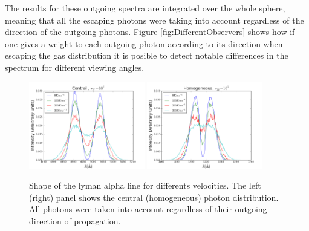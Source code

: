 \documentclass[usenatbib]{mn2e}
\begin{document}
The results for these outgoing spectra are integrated over the whole
sphere, meaning that all the escaping photons were taking into account
regardless of the direction of the outgoing photons. Figure
\ref{fig:DifferentObservers} shows how if one gives a weight to each outgoing
photon according to its direction when escaping the gas distribution
it is posible to detect notable differences in the spectrum for
different viewing angles.



\begin{figure}
  \includegraphics[width=0.45\textwidth]{7tDifSpeedsZ.png}
  \includegraphics[width=0.45\textwidth]{7tHOMDifSpeeds1.png}
\caption{Shape of the lyman alpha line for
    differents velocities. The left (right) panel shows the central
    (homogeneous) photon distribution. All photons were taken into
    account regardless of their outgoing direction of propagation.
  \label{fig:differentvelocities}}
\end{figure}
\end{document}
